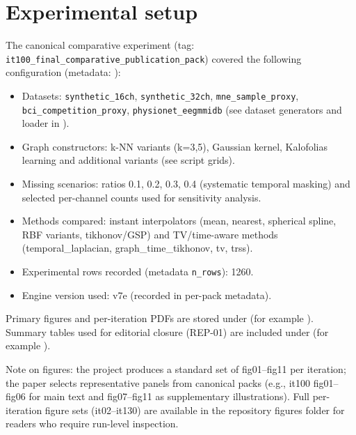 \section{Experimental setup}
The canonical comparative experiment (tag: \texttt{it100\_final\_comparative\_publication\_pack}) covered the following configuration (metadata: ):
\begin{itemize}
  \item Datasets: \texttt{synthetic\_16ch}, \texttt{synthetic\_32ch}, \texttt{mne\_sample\_proxy}, \texttt{bci\_competition\_proxy}, \texttt{physionet\_eegmmidb} (see dataset generators and loader in ).
  \item Graph constructors: k-NN variants (k=3,5), Gaussian kernel, Kalofolias learning and additional variants (see script grids).
  \item Missing scenarios: ratios {0.1, 0.2, 0.3, 0.4} (systematic temporal masking) and selected per-channel counts used for sensitivity analysis.
  \item Methods compared: instant interpolators (mean, nearest, spherical spline, RBF variants, tikhonov/GSP) and TV/time-aware methods (temporal\_laplacian, graph\_time\_tikhonov, tv, trss).
  \item Experimental rows recorded (metadata \texttt{n\_rows}): 1260.
  \item Engine version used: v7e (recorded in per-pack metadata).
\end{itemize}

Primary figures and per-iteration PDFs are stored under  (for example ). Summary tables used for editorial closure (REP-01) are included under  (for example ).

Note on figures: the project produces a standard set of fig01–fig11 per iteration; the paper selects representative panels from canonical packs (e.g., it100 fig01–fig06 for main text and fig07–fig11 as supplementary illustrations). Full per-iteration figure sets (it02–it130) are available in the repository figures folder for readers who require run-level inspection.
